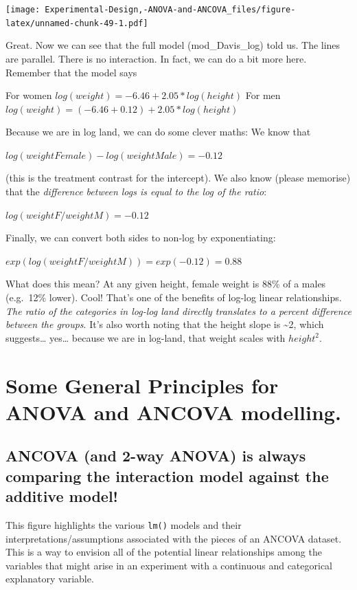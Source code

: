 \documentclass[
]{book}
\begin{document}
\texttt{[image: Experimental-Design,-ANOVA-and-ANCOVA\_files/figure-latex/unnamed-chunk-49-1.pdf]}

Great. Now we can see that the full model (mod\_Davis\_log) told us. The lines are parallel. There is no interaction. In fact, we can do a bit more here. Remember that the model says

For women \(log(weight)= -6.46 + 2.05 * log(height)\)
For men \(log(weight)= (-6.46 + 0.12) + 2.05 * log(height)\)

Because we are in log land, we can do some clever maths: We know that

\(log(weight Female) - log(weight Male) = - 0.12\)

(this is the treatment contrast for the intercept). We also know (please memorise) that the \emph{difference between logs is equal to the log of the ratio}:

\(log(weightF/weightM) = -0.12\)

Finally, we can convert both sides to non-log by exponentiating:

\(exp(log(weightF/weightM)) = exp(-0.12) = 0.88\)

What does this mean? At any given height, female weight is 88\% of a males (e.g.~12\% lower). Cool! That's one of the benefits of log-log linear relationships. \emph{The ratio of the categories in log-log land directly translates to a percent difference between the groups}. It's also worth noting that the height slope is \textasciitilde2, which suggests\ldots{} yes\ldots{} because we are in log-land, that weight scales with \(height^2\).

\hypertarget{some-general-principles-for-anova-and-ancova-modelling.}{%
\section{Some General Principles for ANOVA and ANCOVA modelling.}\label{some-general-principles-for-anova-and-ancova-modelling.}}

\hypertarget{ancova-and-2-way-anova-is-always-comparing-the-interaction-model-against-the-additive-model}{%
\subsection{ANCOVA (and 2-way ANOVA) is always comparing the interaction model against the additive model!}\label{ancova-and-2-way-anova-is-always-comparing-the-interaction-model-against-the-additive-model}}

This figure highlights the various \texttt{lm()} models and their interpretations/assumptions associated with the pieces of an ANCOVA dataset. This is a way to envision all of the potential linear relationships among the variables that might arise in an experiment with a continuous and categorical explanatory variable.
\end{document}
